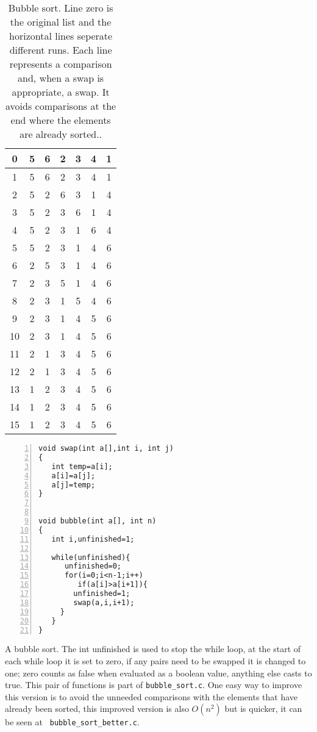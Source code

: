 \documentclass[11pt,a4paper]{scrartcl}
\begin{document}
\begin{table}
\begin{tabular}{c|cccccc}
0&5&6&2&3&4&1\\
\hline
1&5&6&2&3&4&1\\
2&5&2&6&3&1&4\\
3&5&2&3&6&1&4\\
4&5&2&3&1&6&4\\
5&5&2&3&1&4&6\\
\hline
6&2&5&3&1&4&6\\
7&2&3&5&1&4&6\\
8&2&3&1&5&4&6\\
9&2&3&1&4&5&6\\
\hline
10&2&3&1&4&5&6\\
11&2&1&3&4&5&6\\
12&2&1&3&4&5&6\\
\hline
13&1&2&3&4&5&6\\
14&1&2&3&4&5&6\\
\hline
15&1&2&3&4&5&6\\
\end{tabular}
\caption{Bubble sort. Line zero is the original list and the
  horizontal lines seperate different runs. Each line represents a
  comparison and, when a swap is appropriate, a swap. It avoids
  comparisons at the end where the elements are already
  sorted.. \label{table_bubble}}
\end{table}

\begin{table}
\begin{lstlisting}[numbers=left]
void swap(int a[],int i, int j)
{
   int temp=a[i];
   a[i]=a[j];
   a[j]=temp;
}


void bubble(int a[], int n)
{
   int i,unfinished=1;
  
   while(unfinished){
      unfinished=0;
      for(i=0;i<n-1;i++)
         if(a[i]>a[i+1]){
	    unfinished=1;
	    swap(a,i,i+1);	    
	 }
   }
}
\end{lstlisting}
\caption{A bubble sort. The int unfinished is used to stop the while
  loop, at the start of each while loop it is set to zero, if any
  pairs need to be swapped it is changed to one; zero counts as false
  when evaluated as a boolean value, anything else casts to true. This
  pair of functions is part of {\tt bubble\_sort.c}. One easy way to
  improve this version is to avoid the unneeded comparisons with the
  elements that have already been sorted, this improved version is
  also $O(n^2)$ but is quicker, it can be seen at {\tt
    bubble\_sort\_better.c}. \label{c_bubble}}
\end{table}
\end{document}
